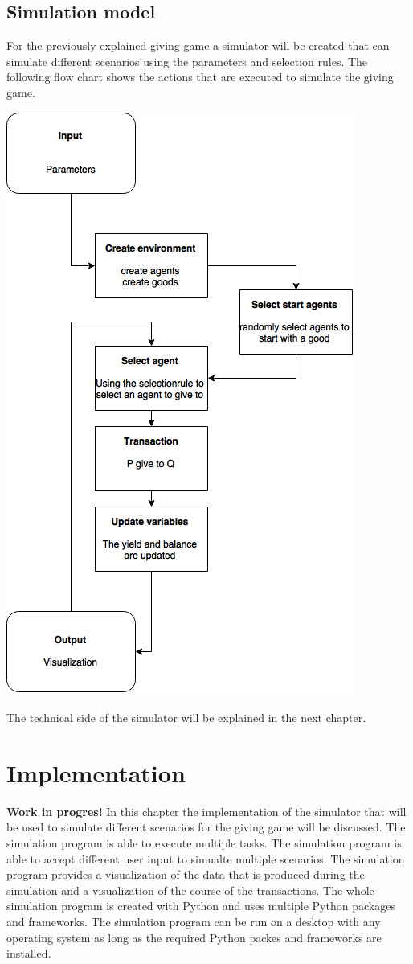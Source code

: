 \documentclass[twoside,openright]{uva-bachelor-thesis}
\begin{document}
\section{Simulation model}
For the previously explained giving game a simulator will be created that can simulate different scenarios using the parameters and selection rules. The following flow chart shows the actions that are executed to simulate the giving game.

\includegraphics[scale=0.6]{FlowChart/FlowChart}

The technical side of the simulator will be explained in the next chapter. 

\chapter{Implementation}
\textbf{Work in progres!}
In this chapter the implementation of the simulator that will be used to simulate different scenarios for the giving game will be discussed. The simulation program is able to execute multiple tasks. The simulation program is able to accept different user input to simualte multiple scenarios. The simulation program provides a visualization of the data that is produced during the simulation and a visualization of the course of the transactions. The whole simulation program is created with Python and uses multiple Python packages and frameworks. The simulation program can be run on a desktop with any operating system as long as the required Python packes and frameworks are installed. 
\end{document}
